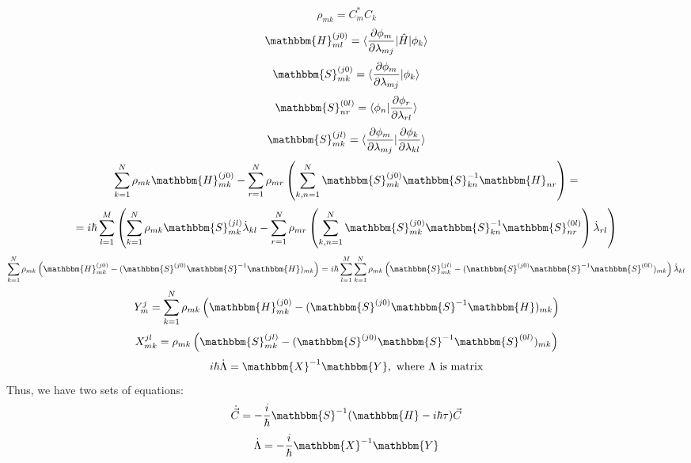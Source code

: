\documentclass[a4paper,14pt]{extarticle}
\begin{document}
$$\rho_{mk} = C_m^*C_k$$
$$\mathbbm{H}_{ml}^{(j0)}=\langle\frac{\partial\phi_m}{\partial\lambda_{mj}}|\hat{H}|\phi_k\rangle$$
$$\mathbbm{S}_{mk}^{(j0)}=\langle\frac{\partial\phi_m}{\partial\lambda_{mj}}|\phi_k\rangle$$
$$\mathbbm{S}_{nr}^{(0l)}=\langle\phi_n|\frac{\partial\phi_r}{\partial\lambda_{rl}}\rangle$$
$$\mathbbm{S}_{mk}^{(jl)}=\langle\frac{\partial\phi_m}{\partial\lambda_{mj}}|%
				 \frac{\partial\phi_k}{\partial\lambda_{kl}}\rangle$$
$$\sum_{k=1}^N\rho_{mk}\mathbbm{H}_{mk}^{(j0)}-%
  \sum_{r=1}^N\rho_{mr}\left(\sum_{k,n=1}^N\mathbbm{S}_{mk}^{(j0)}\mathbbm{S}_{kn}^{-1}\mathbbm{H}_{nr}\right)=$$
$$=i\hbar\sum_{l=1}^M\left(\sum_{k=1}^N\rho_{mk}\mathbbm{S}_{mk}^{(jl)}\dot{\lambda}_{kl}-%
\sum_{r=1}^N\rho_{mr}\left(\sum_{k,n=1}^{N}\mathbbm{S}_{mk}^{(j0)}\mathbbm{S}_{kn}^{-1}\mathbbm{S}_{nr}^{(0l)}\right)\dot{\lambda}_{rl}\right)$$
$$\sum_{k=1}^N\rho_{mk}\left(\mathbbm{H}_{mk}^{(j0)}-%
	                     (\mathbbm{S}^{(j0)}\mathbbm{S}^{-1}\mathbbm{H})_{mk} \right)=%
i\hbar\sum_{l=1}^M\sum_{k=1}^N\rho_{mk}\left(\mathbbm{S}_{mk}^{(jl)}-%
					     (\mathbbm{S}^{(j0)}\mathbbm{S}^{-1}\mathbbm{S}^{(0l)})_{mk}\right)\dot{\lambda}_{kl}$$
$$Y_{m}^j=\sum_{k=1}^N\rho_{mk}\left(\mathbbm{H}_{mk}^{(j0)}-%
	                     (\mathbbm{S}^{(j0)}\mathbbm{S}^{-1}\mathbbm{H})_{mk} \right)$$
$$X_{mk}^{jl}=\rho_{mk}\left(\mathbbm{S}_{mk}^{(jl)}-%
					     (\mathbbm{S}^{(j0)}\mathbbm{S}^{-1}\mathbbm{S}^{(0l)})_{mk}\right)$$
$$i\hbar\dot{\Lambda} = \mathbbm{X}^{-1}\mathbbm{Y},\text{ where }\Lambda\text{ is matrix}$$
Thus, we have two sets of equations:
$$\dot{\vec{C}} = -\frac{i}{\hbar}\mathbbm{S}^{-1}(\mathbbm{H}-i\hbar\tau)\vec{C}$$
$$\dot{\Lambda} = -\frac{i}{\hbar}\mathbbm{X}^{-1}\mathbbm{Y}$$
\end{document}
